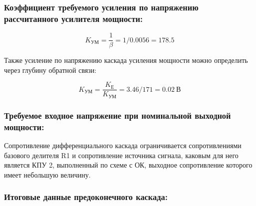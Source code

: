 \subsubsection{	Коэффициент требуемого усиления по напряжению рассчитанного усилителя мощности:}

\begin{equation}
\label{eq:equation4_21}
K_{\text{УМ}}=\dfrac{1}{\beta}=1/0.0056=178.5
\end{equation}

Также усиление по напряжению каскада усиления мощности можно определить через глубину обратной связи:

\begin{equation}
\label{eq:equation4_22}
K_{\text{УМ}}=\dfrac {K_{\text{Е}}}{K_{\text{УМ}}}=3.46/171=0.02~\text{В}
\end{equation}

\subsubsection{Требуемое входное напряжение при номинальной выходной мощности:} %


Сопротивление дифференциального каскада ограничивается сопротивлениями базового делителя R1 и сопротивление источника сигнала, каковым для него является КПУ 2, выполненный по схеме с ОК, выходное сопротивление которого имеет небольшую величину.
\subsubsection{	Итоговые данные предоконечного каскада:	}
